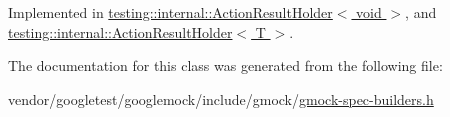 Implemented in \hyperlink{classtesting_1_1internal_1_1ActionResultHolder_3_01void_01_4_a6729c4fe6c33485ece4fbcfea8806e49}{testing\+::internal\+::\+Action\+Result\+Holder$<$ void $>$}, and \hyperlink{classtesting_1_1internal_1_1ActionResultHolder_a70989192d3ed669c059a7e29c4a7b9fc}{testing\+::internal\+::\+Action\+Result\+Holder$<$ T $>$}.



The documentation for this class was generated from the following file\+:\begin{DoxyCompactItemize}
\item 
vendor/googletest/googlemock/include/gmock/\hyperlink{gmock-spec-builders_8h}{gmock-\/spec-\/builders.\+h}\end{DoxyCompactItemize}
